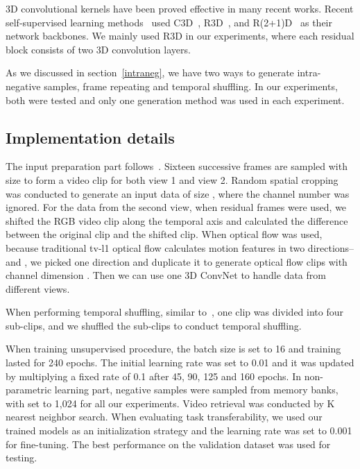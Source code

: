 \documentclass[sigconf]{acmart}
\begin{document}
 3D convolutional kernels have been proved effective in many recent works. Recent self-supervised learning methods~\cite{xu2019self, luo2020video} used C3D~\cite{c3d}, R3D~\cite{res3d}, and R(2+1)D~\cite{r3d} as their network backbones. We mainly used R3D in our experiments, where each residual block consists of two 3D convolution layers.

 As we discussed in section~\ref{intraneg}, we have two ways to generate intra-negative samples, frame repeating and temporal shuffling. In our experiments, both were tested and only one generation method was used in each experiment.

\subsection{Implementation details}
The input preparation part follows~\cite{c3d}. Sixteen successive frames are sampled with size  to form a video clip for both view 1 and view 2. Random spatial cropping was conducted to generate an input data of size , where the channel number  was ignored. For the data from the second view, when residual frames were used, we shifted the RGB video clip along the temporal axis and calculated the difference between the original clip and the shifted clip. When optical flow was used, because traditional tv-l1 optical flow calculates motion features in two directions-- and , we picked one direction and duplicate it to generate optical flow clips with channel dimension . Then we can use one 3D ConvNet to handle data from different views.

When performing temporal shuffling, similar to~\cite{luo2020video}, one clip was divided into four sub-clips, and we shuffled the sub-clips to conduct temporal shuffling. 

When training unsupervised procedure, the batch size is set to 16 and training lasted for 240 epochs. The initial learning rate was set to 0.01 and it was updated by multiplying a fixed rate of 0.1 after 45, 90, 125 and 160 epochs. In non-parametric learning part,  negative samples were sampled from memory banks, with  set to 1,024 for all our experiments. Video retrieval was conducted by K nearest neighbor search. When evaluating task transferability, we used our trained models as an initialization strategy and the learning rate was set to 0.001 for fine-tuning. The best performance on the validation dataset was used for testing.
\end{document}
